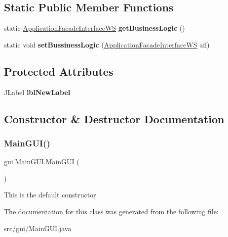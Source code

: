 \subsection*{Static Public Member Functions}
\begin{DoxyCompactItemize}
\item 
\mbox{\label{classgui_1_1_main_g_u_i_a037b3ca54b0c61d6899721ff55cca365}} 
static \mbox{\hyperlink{interfacebusiness_logic_1_1_application_facade_interface_w_s}{Application\+Facade\+Interface\+WS}} {\bfseries get\+Business\+Logic} ()
\item 
\mbox{\label{classgui_1_1_main_g_u_i_a306310290095fdaa31a668470fd6380d}} 
static void {\bfseries set\+Bussiness\+Logic} (\mbox{\hyperlink{interfacebusiness_logic_1_1_application_facade_interface_w_s}{Application\+Facade\+Interface\+WS}} afi)
\end{DoxyCompactItemize}
\subsection*{Protected Attributes}
\begin{DoxyCompactItemize}
\item 
\mbox{\label{classgui_1_1_main_g_u_i_a0fc72962f06022026150f3d01638f929}} 
J\+Label {\bfseries lbl\+New\+Label}
\end{DoxyCompactItemize}


\subsection{Constructor \& Destructor Documentation}
\mbox{\label{classgui_1_1_main_g_u_i_a6968ef45452fe10bd544a46d6e099c32}} 
\subsubsection{\texorpdfstring{MainGUI()}{MainGUI()}}
{\footnotesize\ttfamily gui.\+Main\+G\+U\+I.\+Main\+G\+UI (\begin{DoxyParamCaption}{ }\end{DoxyParamCaption})}

This is the default constructor 

The documentation for this class was generated from the following file\+:\begin{DoxyCompactItemize}
\item 
src/gui/Main\+G\+U\+I.\+java\end{DoxyCompactItemize}
